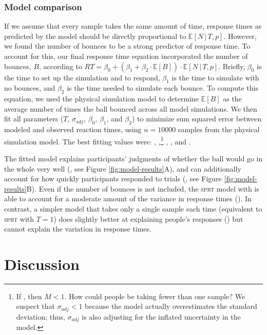 \documentclass[10pt,letterpaper]{article}
\begin{document}
\subsubsection{Model comparison}

If we assume that every sample takes the same amount of time, response times as predicted by the model should be directly proportional to $\mathbb{E}[N\,|\,T,p]$.
However, we found the number of bounces to be a strong predictor of response time.
To account for this, our final response time equation incorporated the number of bounces, $B$, according to $RT = \beta_0 + (\beta_1 + \beta_2\cdot{}\mathbb{E}[B]) \cdot{}\mathbb{E}[N\,|\,T,p]$.
Briefly, $\beta_0$ is the time to set up the simulation and to respond, $\beta_1$ is the time to simulate with no bounces, and $\beta_2$ is the time needed to simulate each bounce.
To compute this equation, we used the physical simulation model to determine $\mathbb{E}[B]$ as the average number of times the ball bounced across all model simulations.
We then fit all parameters ($T$, $\sigma_{adj}$, $\beta_0$, $\beta_1$, and $\beta_2$) to minimize sum squared error between modeled and observed reaction times, using $n=10000$ samples from the physical simulation model.
The best fitting values were: \threshold{}, \sdadj{},\footnote{If \sdadj{}, then $M<1$. How could people be taking fewer than one sample?
We suspect that $\sigma_{adj}<1$ because the model actually overestimates the standard deviation; thus, $\sigma_{adj}$ is also adjusting for the inflated uncertainty in the model.} \betazero{}, \betaone{}, and \betatwo{}.

The fitted model explains participants' judgments of whether the ball would go in the whole very well (\HoleResponseCorr{}, see Figure \ref{fig:model-results}A), and can additionally account for how quickly participants responded to trials (\HoleRTCorr{}, see Figure \ref{fig:model-results}B).
Even if the number of bounces is not included, the \textsc{sprt} model with \threshold{} is able to account for a moderate amount of the variance in response times (\NoBouncesHoleRTCorr{}).
In contrast, a simpler model that takes only a single sample each time (equivalent to \textsc{sprt} with $T=1$) does slightly better at explaining people's responses (\RawHoleResponseCorr{}) but cannot explain the variation in response times.

\section{Discussion}
\end{document}
